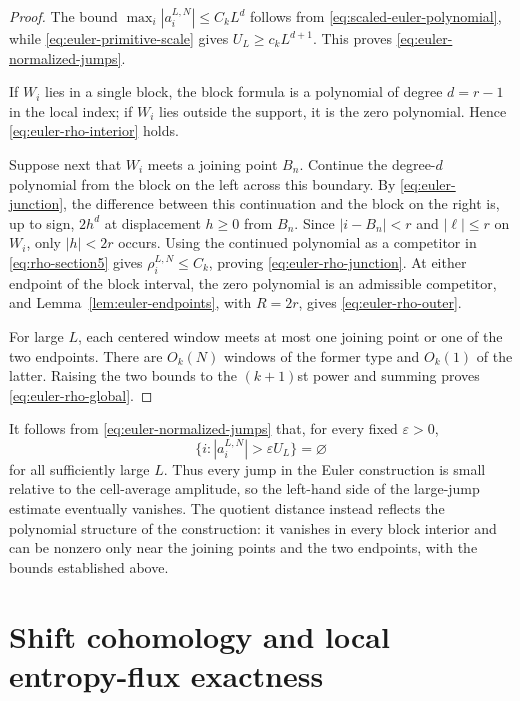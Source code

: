 \documentclass[11pt]{amsart}
\theoremstyle{plain}
\theoremstyle{definition}
\theoremstyle{remark}
\numberwithin{equation}{section}
\theoremstyle{plain}
\begin{document}
\begin{proof}
	The bound $\max_i|a_i^{L,N}|\le C_kL^d$ follows from
	\eqref{eq:scaled-euler-polynomial}, while
	\eqref{eq:euler-primitive-scale} gives $U_L\ge c_kL^{d+1}$.  This proves
	\eqref{eq:euler-normalized-jumps}.

	If $W_i$ lies in a single block, the block formula is a polynomial of
	degree $d=r-1$ in the local index; if $W_i$ lies outside the support, it is
	the zero polynomial.  Hence \eqref{eq:euler-rho-interior} holds.

	Suppose next that $W_i$ meets a joining point $B_n$.
	Continue the degree-$d$ polynomial from the block on the left across this
	boundary.  By
	\eqref{eq:euler-junction}, the difference between this continuation and the
	block on the right is, up to sign, $2h^d$ at displacement $h\ge0$ from
	$B_n$.  Since $|i-B_n|<r$ and $|\ell|\le r$ on $W_i$, only
	$|h|<2r$ occurs.  Using the continued polynomial as a competitor in
	\eqref{eq:rho-section5} gives
	$\rho_i^{L,N}\le C_k$, proving
	\eqref{eq:euler-rho-junction}.  At either endpoint of the block interval, the zero
	polynomial is an admissible competitor, and
	Lemma~\ref{lem:euler-endpoints}, with $R=2r$, gives
	\eqref{eq:euler-rho-outer}.

	For large $L$, each centered window meets at most one joining point or
	one of the two endpoints.  There are $O_k(N)$ windows of
	the former type and $O_k(1)$ of
	the latter.  Raising the two bounds to the $(k+1)$st power and summing proves
	\eqref{eq:euler-rho-global}.
\end{proof}


It follows from \eqref{eq:euler-normalized-jumps} that, for every fixed
$\varepsilon>0$,
\begin{equation}\label{eq:euler-large-jump-set-empty}
	\{i:|a_i^{L,N}|>\varepsilon U_L\}=\varnothing
\end{equation}
for all sufficiently large $L$.  Thus every jump in the Euler construction
is small relative to the cell-average amplitude, so the left-hand side of the
large-jump estimate eventually vanishes.  The quotient distance instead
reflects the polynomial structure of the construction: it vanishes in every
block interior and can be nonzero only near the joining points and the two
endpoints, with the bounds established above.


\section{\texorpdfstring{Shift cohomology and local entropy-flux exactness}{Shift cohomology and local entropy-flux exactness}}
\label{sec:shift-cohomology}
\end{document}
